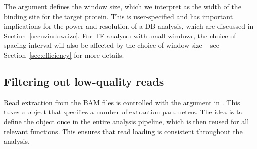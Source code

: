 \documentclass{report}\usepackage[]{graphicx}\usepackage[usenames,dvipsnames]{color}
\begin{document}
\begin{center}
\end{center}

The  argument defines the window size, which we interpret as the width of the binding site for the target protein.
This is user-specified and has important implications for the power and resolution of a DB analysis, which are discussed in Section~\ref{sec:windowsize}.
For TF analyses with small windows, the choice of spacing interval will also be affected by the choice of window size -- see Section~\ref{sec:efficiency} for more details.

\subsection{Filtering out low-quality reads}
Read extraction from the BAM files is controlled with the  argument in .
This takes a  object that specifies a number of extraction parameters.
The idea is to define the  object once in the entire analysis pipeline, which is then reused for all relevant functions.
This ensures that read loading is consistent throughout the analysis.
\end{document}
